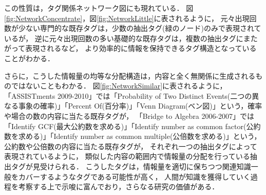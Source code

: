 この性質は，タグ関係ネットワーク図にも現れている．
図\ref{fig:NetworkConcentrate}，図\ref{fig:NetworkLittle}に表されるように，
元々出現回数が少ない専門的な既存タグは，少数の抽出タグ(緑のノード)のみで表現されているが，
逆に元々出現回数の多い基礎的な既存タグは，複数の抽出タグにまたがって表現されるなど，
より効率的に情報を保持できるタグ構造となっていることがわかる．

さらに，こうした情報量の均等な分配構造は，内容と全く無関係に生成されるものではないこともわかる．
図\ref{fig:NetworkSimilar}に表されるように，
「ASSISTments 2009-2010」では「Probability of Two Distinct Events(二つの異なる事象の確率)」「Percent Of(百分率)」「Venn Diagram(ベン図)」という，確率や場合の数の内容に当たる既存タグが，
「Bridge to Algebra 2006-2007」では「Identify GCF(最大公約数を求める)」「Identify number as common factor(公約数を求める)」「Identify number as common multiple(公倍数を求める)」という，公約数や公倍数の内容に当たる既存タグが，
それぞれ一つの抽出タグによって表現されているように，
類似した内容の範囲内で情報量の分配を行っている抽出タグが見受けられる．
こうしたタグは，情報量を適切に保ちつつ関連知識一般をカバーするようなタグである可能性が高く，
人間が知識を獲得していく過程を考察する上で示唆に富んでおり，さらなる研究の価値がある．



